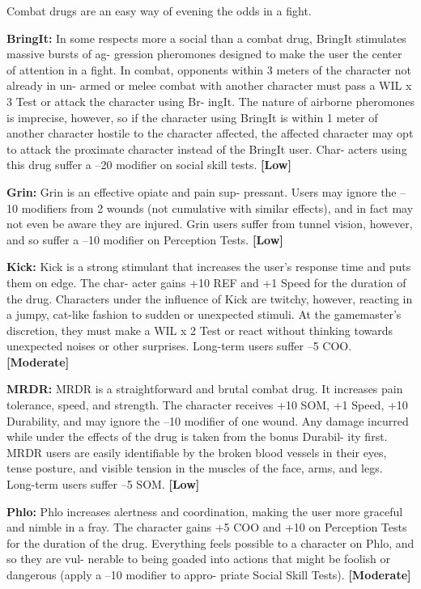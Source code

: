 Combat drugs are an easy way of evening the odds 
in a fight.

\textbf{BringIt:} In some respects more a social than a 
combat drug, BringIt stimulates massive bursts of ag-
gression pheromones designed to make the user the 
center of attention in a fight. In combat, opponents 
within 3 meters of the character not already in un-
armed or melee combat with another character must 
pass a WIL x 3 Test or attack the character using Br-
ingIt. The nature of airborne pheromones is imprecise, 
however, so if the character using BringIt is within 
1 meter of another character hostile to the character 
affected, the affected character may opt to attack the 
proximate character instead of the BringIt user. Char-
acters using this drug suffer a –20 modifier on social 
skill tests. \textbf{[Low]}

\textbf{Grin:} Grin is an effective opiate and pain sup-
pressant. Users may ignore the –10 modifiers from 
2 wounds (not cumulative with similar effects), and 
in fact may not even be aware they are injured. Grin 
users suffer from tunnel vision, however, and so suffer 
a –10 modifier on Perception Tests. \textbf{[Low]}

\textbf{Kick:} Kick is a strong stimulant that increases the 
user's response time and puts them on edge. The char-
acter gains +10 REF and +1 Speed for the duration of 
the drug. Characters under the influence of Kick are 
twitchy, however, reacting in a jumpy, cat-like fashion 
to sudden or unexpected stimuli. At the gamemaster's 
discretion, they must make a WIL x 2 Test or react 
without thinking towards unexpected noises or other 
surprises. Long-term users suffer –5 COO. \textbf{[Moderate]}

\textbf{MRDR:  }MRDR is a straightforward and brutal 
combat drug. It increases pain tolerance, speed, and 
strength. The character receives +10 SOM, +1 Speed, 
+10 Durability, and may ignore the –10 modifier of 
one wound. Any damage incurred while under the 
effects of the drug is taken from the bonus Durabil-
ity first. MRDR users are easily identifiable by the 
broken blood vessels in their eyes, tense posture, and 
visible tension in the muscles of the face, arms, and 
legs. Long-term users suffer –5 SOM. \textbf{[Low]}

\textbf{Phlo:} Phlo increases alertness and coordination, 
making the user more graceful and nimble in a fray. 
The character gains +5 COO and +10 on Perception 
Tests for the duration of the drug. Everything feels 
possible to a character on Phlo, and so they are vul-
nerable to being goaded into actions that might be 
foolish or dangerous (apply a –10 modifier to appro-
priate Social Skill Tests). \textbf{[Moderate]}

